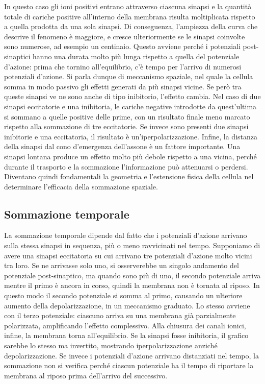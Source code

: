 \documentclass[12pt,a4paper,openany]{book}
\begin{document}
In questo caso gli ioni positivi entrano attraverso ciascuna sinapsi e la quantità totale di cariche positive all’interno della membrana risulta moltiplicata rispetto a quella prodotta da una sola sinapsi. Di conseguenza, l’ampiezza della curva che descrive il fenomeno è maggiore, e cresce ulteriormente se le sinapsi coinvolte sono numerose, ad esempio un centinaio. Questo avviene perché i potenziali post-sinaptici hanno una durata molto più lunga rispetto a quella del potenziale d’azione: prima che tornino all’equilibrio, c’è tempo per l’arrivo di numerosi potenziali d’azione. Si parla dunque di meccanismo spaziale, nel quale la cellula somma in modo passivo gli effetti generati da più sinapsi vicine.
Se però tra queste sinapsi ve ne sono anche di tipo inibitorio, l’effetto cambia. Nel caso di due sinapsi eccitatorie e una inibitoria, le cariche negative introdotte da quest’ultima si sommano a quelle positive delle prime, con un risultato finale meno marcato rispetto alla sommazione di tre eccitatorie. Se invece sono presenti due sinapsi inibitorie e una eccitatoria, il risultato è un’iperpolarizzazione.
Infine, la distanza della sinapsi dal cono d’emergenza dell’assone è un fattore importante. Una sinapsi lontana produce un effetto molto più debole rispetto a una vicina, perché durante il trasporto e la sommazione l’informazione può attenuarsi o perdersi. Diventano quindi fondamentali la geometria e l’estensione fisica della cellula nel determinare l’efficacia della sommazione spaziale.

\subsection*{Sommazione temporale}

La sommazione temporale dipende dal fatto che i potenziali d’azione arrivano sulla stessa sinapsi in sequenza, più o meno ravvicinati nel tempo.
Supponiamo di avere una sinapsi eccitatoria su cui arrivano tre potenziali d’azione molto vicini tra loro. Se ne arrivasse solo uno, si osserverebbe un singolo andamento del potenziale post-sinaptico, ma quando sono più di uno, il secondo potenziale arriva mentre il primo è ancora in corso, quindi la membrana non è tornata al riposo. In questo modo il secondo potenziale si somma al primo, causando un ulteriore aumento della depolarizzazione, in un meccanismo graduato. Lo stesso avviene con il terzo potenziale: ciascuno arriva su una membrana già parzialmente polarizzata, amplificando l’effetto complessivo. Alla chiusura dei canali ionici, infine, la membrana torna all’equilibrio.
Se la sinapsi fosse inibitoria, il grafico sarebbe lo stesso ma invertito, mostrando iperpolarizzazione anziché depolarizzazione. Se invece i potenziali d’azione arrivano distanziati nel tempo, la sommazione non si verifica perché ciascun potenziale ha il tempo di riportare la membrana al riposo prima dell’arrivo del successivo.
\end{document}
